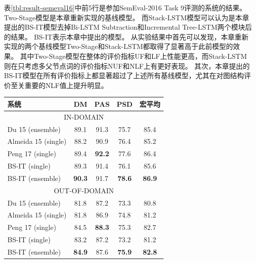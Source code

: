 表\ref{tbl:result-semeval16}中前5行是参加SemEval-2016 Task 9评测的系统的结果。
Two-Stage模型是本章重新实现的基线模型。
而Stack-LSTM模型可以认为是本章提出的BS-IT模型去掉Bi-LSTM Subtraction和Incremental Tree-LSTM两个模块后的结果。
BS-IT表示本章中提出的模型。
从实验结果中首先可以发现，本章重新实现的两个基线模型Two-Stage和Stack-LSTM都取得了显著高于此前模型的效果。
其中Two-Stage模型在整体的评价指标UF和LF上性能更高，而Stack-LSTM则在只考虑多父节点词的评价指标NUF和NLF上有更好表现。
其次，本章提出的BS-IT模型在所有评价指标上都显著超过了上述所有基线模型，尤其在对图结构评价至关重要的NLF值上提升明显。

\begin{table}[htpb]
    \vspace{0.5em}\centering\wuhao
	\begin{tabular}{lcccc}
		\toprule[1.5pt]
		系统& DM & PAS & PSD & 宏平均\\
		\midrule[1pt]
		\multicolumn{5}{c}{IN-DOMAIN}\\
		\hline
		Du 15 (ensemble) &89.1&91.3&75.7&85.4\\
		Almeida 15 (single) &88.2&90.9&76.4&85.2\\
		Peng 17 (single) &89.4&\bf 92.2&77.6&86.4\\
		BS-IT (single) &89.3&91.4&76.1&85.6\\
		BS-IT (ensemble) &\bf 90.3& 91.7&\bf 78.6&\bf 86.9\\
		\hline
		\multicolumn{5}{c}{OUT-OF-DOMAIN}\\
		\hline
		Du 15 (ensemble) &81.8&87.2&73.3&80.8\\
		Almeida 15 (single) &81.8&86.9&74.8&81.2\\
		Peng 17 (single) &84.5&\bf 88.3&75.3&82.7\\
		BS-IT (single) &83.2&87.2&73.2&81.2\\
		BS-IT (ensemble) &\bf 84.9&87.6&\bf 75.9&\bf 82.8\\
		\bottomrule[1.5pt]
	\end{tabular}
\end{table}

